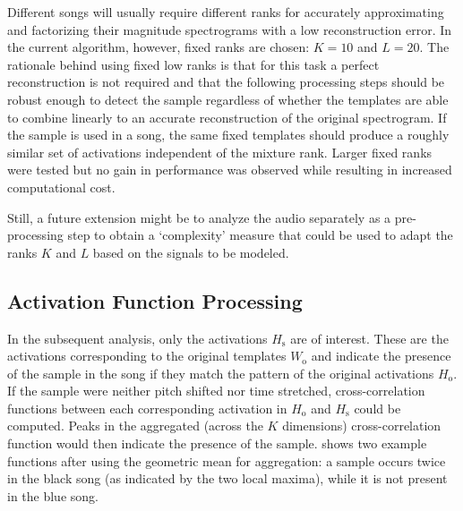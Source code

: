 \documentclass{article}
\begin{document}
Different songs will usually require different ranks for accurately approximating and factorizing their magnitude spectrograms with a low reconstruction error. In the current algorithm, however, fixed ranks are chosen: $K=10$ and $L=20$. The rationale behind using fixed low ranks is that for this task a perfect reconstruction is not required and that the following processing steps should be robust enough to detect the sample regardless of whether the templates are able to combine linearly to an accurate reconstruction of  the original spectrogram. If the sample is used in a song, the same fixed templates should produce a roughly similar set of activations independent of the mixture rank. Larger fixed ranks were tested but no gain in performance was observed while resulting in increased computational cost.

Still, a future extension might be to analyze the audio separately as a pre-processing step to obtain a `complexity' measure that could be used to adapt the ranks $K$ and $L$ based on the signals to be modeled. 

\subsection{Activation Function Processing}
In the subsequent analysis, only the activations $H_\mathrm{s}$ are of interest. These are the activations corresponding to the original templates $W_\mathrm{o}$ and indicate the presence of the sample in the song if they match the pattern of the original activations $H_\mathrm{o}$. If the sample were neither pitch shifted nor time stretched, cross-correlation functions between each corresponding activation in $H_\mathrm{o}$ and $H_\mathrm{s}$ could be computed. Peaks in the aggregated (across the $K$ dimensions) cross-correlation function would then indicate the presence of the sample.  shows two example functions after using the geometric mean for aggregation: a sample occurs twice in the black song (as indicated by the two local maxima), while it is not present in the blue song.

\end{document}
